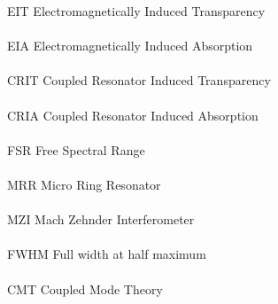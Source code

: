 
EIT Electromagnetically Induced Transparency\\
\\EIA Electromagnetically Induced Absorption\\
\\CRIT Coupled Resonator Induced Transparency\\
\\CRIA Coupled Resonator Induced Absorption\\
\\FSR Free Spectral Range\\
\\MRR Micro Ring Resonator\\
\\MZI Mach Zehnder Interferometer\\
\\FWHM Full width at half maximum\\
\\CMT Coupled Mode Theory